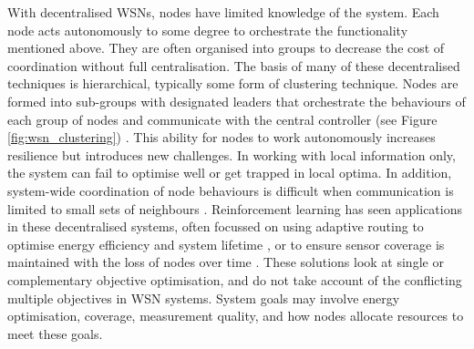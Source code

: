 With decentralised WSNs, nodes have limited knowledge of the system. Each node acts autonomously to some degree to orchestrate the functionality mentioned above. They are often organised into groups to decrease the cost of coordination without full centralisation. The basis of many of these decentralised techniques is hierarchical, typically some form of clustering technique. Nodes are formed into sub-groups with designated leaders that orchestrate the behaviours of each group of nodes and communicate with the central controller (see Figure \ref{fig:wsn_clustering}) . This ability for nodes to work autonomously increases resilience but introduces new challenges. In working with local information only, the system can fail to optimise well or get trapped in local optima. In addition, system-wide coordination of node behaviours is difficult when communication is limited to small sets of neighbours \citep{Carlos-Mancilla2016}. Reinforcement learning has seen applications in these decentralised systems, often focussed on using adaptive routing  to optimise energy efficiency and system lifetime \citep{ 10.1504/IJCNDS.2012.048871, Kulkarnib}, or to ensure sensor coverage is maintained with the loss of nodes over time \citep{Sharma2020}. These solutions look at single or complementary objective optimisation, and do not take account of the conflicting multiple objectives in WSN systems. System goals may involve energy optimisation, coverage, measurement quality, and how nodes allocate resources to meet these goals. 

